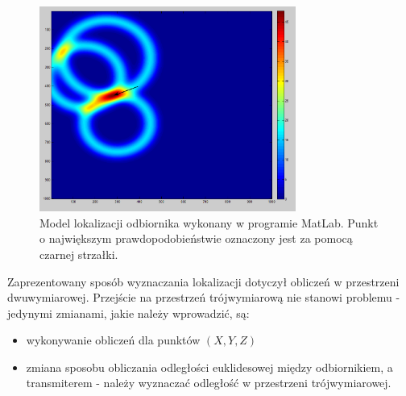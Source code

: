 \begin{figure}[H]			
	\centering
	\caption{Model lokalizacji odbiornika wykonany w programie MatLab. Punkt o największym prawdopodobieństwie oznaczony jest za pomocą czarnej strzałki.}
	\includegraphics[width=0.75\textwidth]{guasianRouter}
\end{figure}
Zaprezentowany sposób wyznaczania lokalizacji dotyczył obliczeń w przestrzeni dwuwymiarowej. Przejście na przestrzeń trójwymiarową nie stanowi problemu - jedynymi zmianami, jakie należy wprowadzić, są:
\begin{itemize}
	\item wykonywanie obliczeń dla punktów $(X,Y,Z)$
	\item zmiana sposobu obliczania odległości euklidesowej między odbiornikiem, a transmiterem - należy wyznaczać odległość w przestrzeni trójwymiarowej.
\end{itemize}
